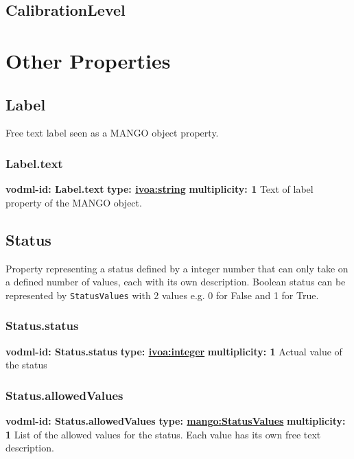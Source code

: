   \subsection{CalibrationLevel}

\section{Other Properties}

  \subsection{Label}
    \label{sect:Label}
    Free text label seen as a MANGO object property.

    \subsubsection{Label.text}
    \textbf{vodml-id: Label.text} \newline
    \textbf{type: \hyperref[sect:ivoa]{ivoa:string}} \newline
    \textbf{multiplicity: 1} \newline
    Text of label property of the MANGO object.

  \subsection{Status}
    \label{sect:Status}
    Property representing a status defined by a integer number that can only take on a defined number of values, each with its own description. Boolean status can be represented by \texttt{StatusValues} with 2 values e.g. 0 for False and 1 for True.

    \subsubsection{Status.status}
    \textbf{vodml-id: Status.status} \newline
    \textbf{type: \hyperref[sect:ivoa]{ivoa:integer}} \newline
    \textbf{multiplicity: 1} \newline
    Actual value of the status

    \subsubsection{Status.allowedValues}
    \textbf{vodml-id: Status.allowedValues} \newline
    \textbf{type: \hyperref[sect:StatusValues]{mango:StatusValues}} \newline
    \textbf{multiplicity: 1} \newline
    List of the allowed values for the status. Each value has its own free text description.

